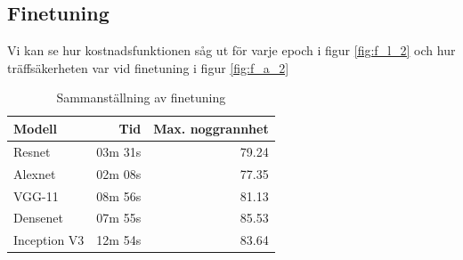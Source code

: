 \documentclass[]{kththesis}
\begin{document}
\subsection{Finetuning}
Vi kan se hur kostnadsfunktionen såg ut för varje epoch i figur \ref{fig:f_l_2} och hur träffsäkerheten var vid finetuning i figur \ref{fig:f_a_2}

\begin{table}
  \centering
  \begin{tabular}{|l|r|r|}
    Modell & Tid & Max. noggrannhet \\ 
    \hline
    Resnet       & 03m 31s & 79.24 \\
    Alexnet      & 02m 08s & 77.35 \\
    VGG-11       & 08m 56s & 81.13 \\
    Densenet     & 07m 55s & 85.53 \\
    Inception V3 & 12m 54s & 83.64 \\
  \end{tabular}
  \caption{Sammanställning av finetuning}
\end{table}
\end{document}
